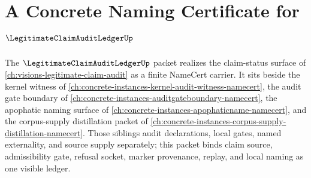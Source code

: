 \chapter{A Concrete Naming Certificate for $\LegitimateClaimAuditLedgerUp$}
\label{ch:concrete-instances-legitimate-claim-audit-ledger-namecert}

The $\LegitimateClaimAuditLedgerUp$ packet realizes the claim-status surface of \autoref{ch:visions-legitimate-claim-audit} as a finite NameCert carrier. It sits beside the kernel witness of \autoref{ch:concrete-instances-kernel-audit-witness-namecert}, the audit gate boundary of \autoref{ch:concrete-instances-auditgateboundary-namecert}, the apophatic naming surface of \autoref{ch:concrete-instances-apophaticname-namecert}, and the corpus-supply distillation packet of \autoref{ch:concrete-instances-corpus-supply-distillation-namecert}. Those siblings audit declarations, local gates, named externality, and source supply separately; this packet binds claim source, admissibility gate, refusal socket, marker provenance, replay, and local naming as one visible ledger.

